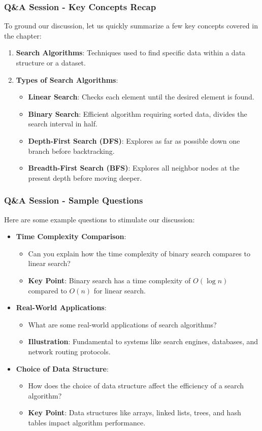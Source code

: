 \documentclass[aspectratio=169]{beamer}
\begin{document}
\begin{frame}[fragile]
  \frametitle{Q\&A Session - Key Concepts Recap}
  To ground our discussion, let us quickly summarize a few key concepts covered in the chapter:
  \begin{enumerate}
      \item \textbf{Search Algorithms}: Techniques used to find specific data within a data structure or a dataset.
      \item \textbf{Types of Search Algorithms}:
      \begin{itemize}
          \item \textbf{Linear Search}: Checks each element until the desired element is found.
          \item \textbf{Binary Search}: Efficient algorithm requiring sorted data, divides the search interval in half.
          \item \textbf{Depth-First Search (DFS)}: Explores as far as possible down one branch before backtracking.
          \item \textbf{Breadth-First Search (BFS)}: Explores all neighbor nodes at the present depth before moving deeper.
      \end{itemize}
  \end{enumerate}
\end{frame}

\begin{frame}[fragile]
  \frametitle{Q\&A Session - Sample Questions}
  Here are some example questions to stimulate our discussion:
  \begin{itemize}
      \item \textbf{Time Complexity Comparison}:
      \begin{itemize}
          \item Can you explain how the time complexity of binary search compares to linear search?
          \item \textbf{Key Point}: Binary search has a time complexity of \(O(\log n)\) compared to \(O(n)\) for linear search.
      \end{itemize}
      \item \textbf{Real-World Applications}:
      \begin{itemize}
          \item What are some real-world applications of search algorithms?
          \item \textbf{Illustration}: Fundamental to systems like search engines, databases, and network routing protocols.
      \end{itemize}
      \item \textbf{Choice of Data Structure}:
      \begin{itemize}
          \item How does the choice of data structure affect the efficiency of a search algorithm?
          \item \textbf{Key Point}: Data structures like arrays, linked lists, trees, and hash tables impact algorithm performance.
      \end{itemize}
  \end{itemize}
\end{frame}
\end{document}
